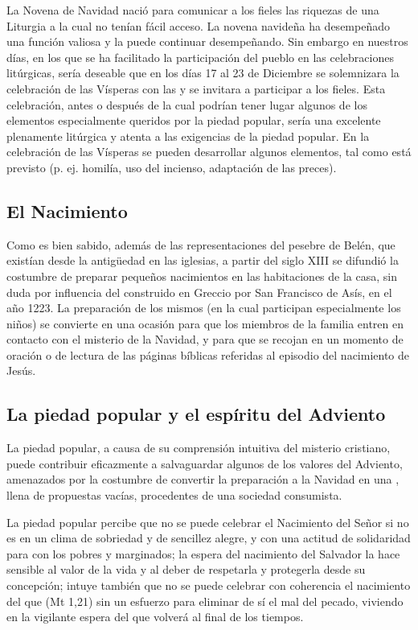 \begin{introstyle}
	La Novena de Navidad nació para comunicar a los fieles las riquezas de una Liturgia a la cual no tenían fácil acceso. La novena navideña ha desempeñado una función valiosa y la puede continuar desempeñando. Sin embargo en nuestros días, en los que se ha facilitado la participación del pueblo en las celebraciones litúrgicas, sería deseable que en los días 17 al 23 de Diciembre se solemnizara la celebración de las Vísperas con las  y se invitara a participar a los fieles. Esta celebración, antes o después de la cual podrían tener lugar algunos de los elementos especialmente queridos por la piedad popular, sería una excelente  plenamente litúrgica y atenta a las exigencias de la piedad popular. En la celebración de las Vísperas se pueden desarrollar algunos elementos, tal como está previsto (p. ej. homilía, uso del incienso, adaptación de las preces).
	
	\subsection{El Nacimiento}
	
	Como es bien sabido, además de las representaciones del pesebre de Belén, que existían desde la antigüedad en las iglesias, a partir del siglo XIII se difundió la costumbre de preparar pequeños nacimientos en las habitaciones de la casa, sin duda por influencia del  construido en Greccio por San Francisco de Asís, en el año 1223. La preparación de los mismos (en la cual participan especialmente los niños) se convierte en una ocasión para que los miembros de la familia entren en contacto con el misterio de la Navidad, y para que se recojan en un momento de oración o de lectura de las páginas bíblicas referidas al episodio del nacimiento de Jesús.
	
	\subsection{La piedad popular y el espíritu del Adviento}
	
	La piedad popular, a causa de su comprensión intuitiva del misterio cristiano, puede contribuir eficazmente a salvaguardar algunos de los valores del Adviento, amenazados por la costumbre de convertir la preparación a la Navidad en una , llena de propuestas vacías, procedentes de una sociedad consumista.
	
	La piedad popular percibe que no se puede celebrar el Nacimiento del Señor si no es en un clima de sobriedad y de sencillez alegre, y con una actitud de solidaridad para con los pobres y marginados; la espera del nacimiento del Salvador la hace sensible al valor de la vida y al deber de respetarla y protegerla desde su concepción; intuye también que no se puede celebrar con coherencia el nacimiento del que  (Mt 1,21) sin un esfuerzo para eliminar de sí el mal del pecado, viviendo en la vigilante espera del que volverá al final de los tiempos.
	

\end{introstyle}
